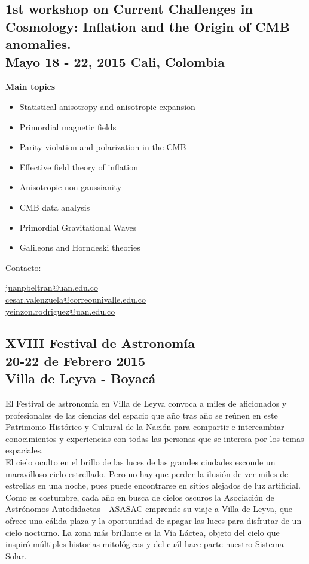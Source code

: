 \documentclass{book}
\begin{document}
\subsection{1st workshop on Current Challenges in Cosmology: Inflation and the Origin of CMB anomalies.\\ Mayo 18 - 22, 2015 Cali, Colombia}

\textbf{Main topics}
\begin{itemize}
\item Statistical anisotropy and anisotropic expansion
\item Primordial magnetic fields
\item Parity violation and polarization in the CMB
\item Effective field theory of inflation
\item Anisotropic non-gaussianity
\item CMB data analysis
\item Primordial Gravitational  Waves
\item Galileons and Horndeski theories
\end{itemize}

Contacto:\\
\begin{flushright}
\url{juanpbeltran@uan.edu.co}\\
\url{cesar.valenzuela@correounivalle.edu.co}\\
\url{yeinzon.rodriguez@uan.edu.co}
\end{flushright}
\newpage
\subsection{XVIII Festival de Astronomía\\20-22 de Febrero 2015\\Villa de Leyva - Boyacá}

El Festival de astronomía en Villa de Leyva convoca a miles de aficionados y profesionales de las ciencias del espacio que año tras año se reúnen en este Patrimonio Histórico y Cultural de la Nación para compartir e intercambiar conocimientos y experiencias con todas las personas que se interesa por los temas espaciales.\\

\noindent El cielo oculto en el brillo de las luces de las grandes ciudades esconde un maravilloso cielo estrellado. Pero no hay que perder la ilusión de ver miles de estrellas en una noche, pues puede encontrarse en sitios alejados de luz artificial. Como es costumbre, cada año en busca de cielos oscuros la Asociación de Astrónomos Autodidactas - ASASAC emprende su viaje a Villa de Leyva, que ofrece una cálida plaza y la oportunidad de apagar las luces para disfrutar de un cielo nocturno. La zona más brillante es la Vía Láctea, objeto del cielo que inspiró múltiples historias mitológicas y del cuál hace parte nuestro Sistema Solar.\\
\end{document}
